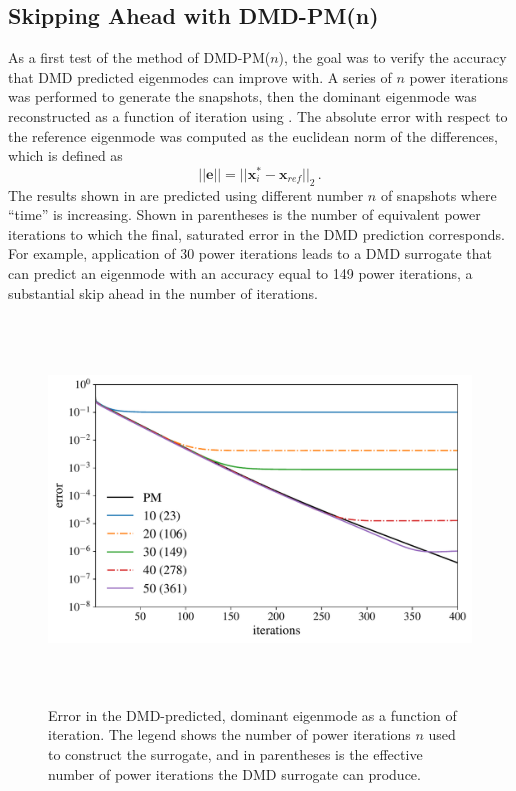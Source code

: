 \subsection{Skipping Ahead with DMD-PM(n)}
As a first test of the method of DMD-PM($n$), the goal was to verify the accuracy that DMD predicted eigenmodes can improve with.
A series of $n$ power iterations was performed to generate the snapshots, then the dominant eigenmode
was reconstructed as a function of iteration using .
The absolute error with respect to the reference eigenmode was computed as the euclidean norm of the differences, which is defined as 
\begin{equation}
 ||\mathbf{e}|| =  ||\mathbf{x}^{*}_i-\mathbf{x}_{ref}||_2   \, .
 \label{eq:error}
\end{equation}
The results shown in  are predicted using different number $n$ of snapshots where ``time'' is increasing.
Shown in parentheses is the number of equivalent power iterations to which the final, saturated error in the DMD prediction corresponds.
For example, application of 30 power iterations leads to a DMD surrogate that can predict an eigenmode with an accuracy equal to 149 power iterations, a substantial skip ahead in the number of iterations.

\begin{figure}[htb]%
    \centering
    \includegraphics[height=4.0in]{tex/figures/skipahead.pdf}
   \caption{Error in the DMD-predicted, dominant eigenmode as a function of iteration.  The legend shows the number of power iterations $n$ used to construct the surrogate, and in parentheses is the effective number of power iterations the DMD surrogate can produce.}
  \label{fig:skipahead}
\end{figure}

